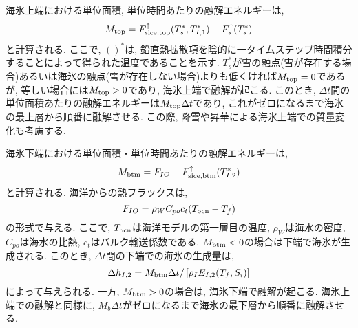 海氷上端における単位面積, 単位時間あたりの融解エネルギーは, 
\begin{equation*}
 M_{\rm top} = F_{\rm sice,top}^\uparrow (T_s^*, T_{I,1}^*)
              - F_s^\uparrow (T_s^*)
\label{eq:sice_3lyr_model_surface_energy_budget}              
\end{equation*}
と計算される. 
ここで, $()^*$は, 鉛直熱拡散項を陰的に一タイムステップ時間積分することによって得られた温度であることを示す.
$T_s^*$が雪の融点(雪が存在する場合)あるいは海氷の融点(雪が存在しない場合)よりも低くければ$M_{\rm top}=0$であるが, 
等しい場合には$M_{\rm top}>0$であり, 海氷上端で融解が起こる. 
このとき, $\Delta t$間の単位面積あたりの融解エネルギーは$M_{\rm top} \Delta t$であり, 
これがゼロになるまで海氷の最上層から順番に融解させる. 
この際, 降雪や昇華による海氷上端での質量変化も考慮する. 

海氷下端における単位面積・単位時間あたりの融解エネルギーは, 
\begin{equation*}
 M_{\rm btm} = F_{IO} - F_{\rm sice,btm}^\uparrow (T_{I,2}^*)
\label{eq:sice_3lyr_model_bottom_energy_budget}
\end{equation*}
と計算される.  
海洋からの熱フラックスは, 
$$
 F_{IO} = \rho_W C_{po} c_t (T_{\rm ocn} - T_f)
$$
の形式で与える. 
ここで, $T_{\rm ocn}$は海洋モデルの第一層目の温度, 
$\rho_W$は海水の密度, $C_{po}$は海水の比熱, 
$c_t$はバルク輸送係数である. 
$M_{\rm btm}<0$の場合は下端で海氷が生成される. 
このとき, $\Delta t$間の下端での海氷の生成量は, 
\begin{equation*}
 \Delta h_{I,2} 
 = M_{\rm btm} \Delta t / \left[ \rho_I E_{I,2}(T_f,S_i) \right]
\end{equation*}
によって与えられる. 
一方, $M_{\rm btm}>0$の場合は, 海氷下端で融解が起こる. 
海氷上端での融解と同様に, $M_b \Delta t$がゼロになるまで海氷の最下層から順番に融解させる. 

